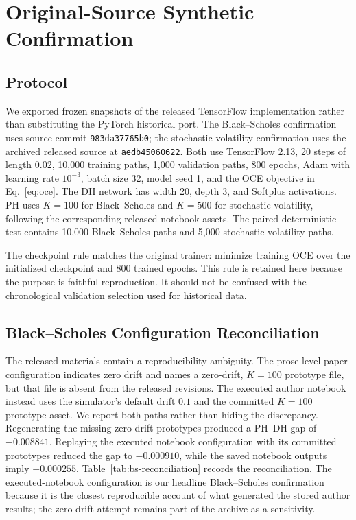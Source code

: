 \documentclass[conference]{IEEEtran}
\begin{document}
\section{Original-Source Synthetic Confirmation}
\label{sec:synthetic}

\subsection{Protocol}

We exported frozen snapshots of the released TensorFlow implementation rather
than substituting the PyTorch historical port. The Black--Scholes confirmation
uses source commit \texttt{983da37765b0}; the stochastic-volatility confirmation
uses the archived released source at \texttt{aedb45060622}. Both use TensorFlow
2.13, 20 steps of length $0.02$, 10,000 training paths, 1,000 validation paths,
800 epochs, Adam with learning rate $10^{-3}$, batch size 32, model seed 1, and
the OCE objective in Eq.~\eqref{eq:oce}. The DH network has width 20, depth 3,
and Softplus activations. PH uses $K=100$ for Black--Scholes and $K=500$ for
stochastic volatility, following the corresponding released notebook assets.
The paired deterministic test contains 10,000 Black--Scholes paths and 5,000
stochastic-volatility paths.

The checkpoint rule matches the original trainer: minimize training OCE over
the initialized checkpoint and 800 trained epochs. This rule is retained here
because the purpose is faithful reproduction. It should not be confused with
the chronological validation selection used for historical data.

\subsection{Black--Scholes Configuration Reconciliation}

The released materials contain a reproducibility ambiguity. The prose-level
paper configuration indicates zero drift and names a zero-drift, $K=100$
prototype file, but that file is absent from the released revisions. The
executed author notebook instead uses the simulator's default drift $0.1$ and
the committed $K=100$ prototype asset. We report both paths rather than hiding
the discrepancy. Regenerating the missing zero-drift prototypes produced a
PH--DH gap of $-0.008841$. Replaying the executed notebook configuration with
its committed prototypes reduced the gap to $-0.000910$, while the saved
notebook outputs imply $-0.000255$. Table~\ref{tab:bs-reconciliation} records
the reconciliation. The executed-notebook configuration is our headline
Black--Scholes confirmation because it is the closest reproducible account of
what generated the stored author results; the zero-drift attempt remains part
of the archive as a sensitivity.
\end{document}
